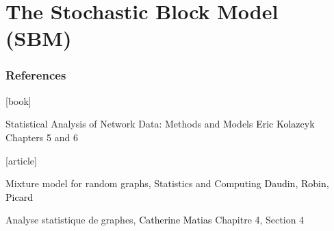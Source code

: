 \documentclass{beamer}\usepackage[]{graphicx}\usepackage[]{color}
\begin{document}
% 
% 



\section{The Stochastic Block Model (SBM)}

\begin{frame}
  \frametitle{References}

    \begin{thebibliography}{99}
      [book]

     Statistical Analysis of Network Data: Methods and Models
    \newblock \textcolor{black}{Eric Kolazcyk}
    \newblock \alert{Chapters 5 and 6}

      [article]

     Mixture model for random graphs, Statistics and Computing
    \newblock \textcolor{black}{Daudin, Robin, Picard}

     Analyse statistique de graphes,
    \newblock \textcolor{black}{Catherine Matias}
    \newblock \alert{Chapitre 4, Section 4}

    \end{thebibliography}

\end{frame}
\end{document}
